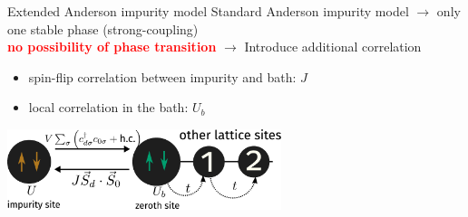 \documentclass[11pt,aspectratio=169]{beamer}
\newcommand{\focus}[1]{\textcolor{red}{\bf{#1}}}
\begin{document}
\begin{frame}{Extended Anderson impurity model}
Standard Anderson impurity model \(\longrightarrow\) only one stable phase (strong-coupling) \\[10pt]
\focus{no possibility of phase transition} \(\longrightarrow\) Introduce additional correlation\\[20pt]
\begin{itemize}
	\item spin-flip correlation between impurity and bath: \(J\)
	\item local correlation in the bath: \(U_b\)
\end{itemize}

\vspace*{\fill}

\includegraphics[width=0.6\textwidth]{zeromode_bare.pdf}

\end{frame}
\end{document}
